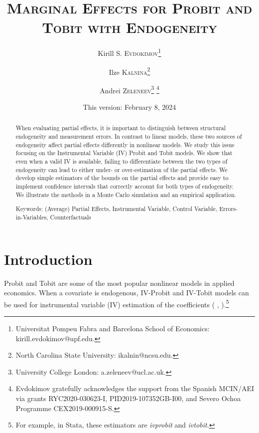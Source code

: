 \documentclass[12pt]{article}
\begin{document}
\title{\textsc{Marginal Effects for Probit and Tobit with Endogeneity}}
\author{Kirill S. \textsc{Evdokimov}\thanks{%
Universitat Pompeu Fabra and Barcelona School of Economics: \textsf{%
kirill.evdokimov@upf.edu}.} \and Ilze \textsc{Kalnina}\thanks{%
North Carolina State University: \textsf{ikalnin@ncsu.edu}.} \and Andrei 
\textsc{Zeleneev}\thanks{%
University College London: \textsf{a.zeleneev@ucl.ac.uk}.} \thanks{
Evdokimov gratefully acknowledges the support from the Spanish MCIN/AEI via
grants RYC2020-030623-I, PID2019-107352GB-I00, and Severo Ochoa Programme
CEX2019-000915-S.}}
\date{This version: February 8, 2024} %
\maketitle

\begin{abstract}

When evaluating partial effects, it is important to distinguish between
structural endogeneity and measurement errors. In contrast to linear models,
these two sources of endogeneity affect partial effects differently in
nonlinear models. We study this issue focusing on the Instrumental Variable
(IV) Probit and Tobit models. We show that even when a valid IV is
available, failing to differentiate between the two types of endogeneity can
lead to either under- or over-estimation of the partial effects. We develop
simple estimators of the bounds on the partial effects and provide easy to
implement confidence intervals that correctly account for both types of
endogeneity. We illustrate the methods in a Monte Carlo simulation and an
empirical application.

\bigskip

Keywords: (Average) Partial Effects, Instrumental Variable, Control
Variable, Errors-in-Variables, Counterfactuals
\end{abstract}

\newpage

\section{Introduction}

Probit and Tobit are some of the most popular nonlinear models in applied
economics. When a covariate is endogenous, IV-Probit and IV-Tobit models can
be used for instrumental variable (IV) estimation of the coefficients (%
\citealp{SmithBlundell1986Ecta}, \citealp{RiversVuong1988JoE}).\footnote{%
For example, in Stata, these estimators are \textit{ivprobit} and \textit{%
ivtobit}.}
\end{document}
